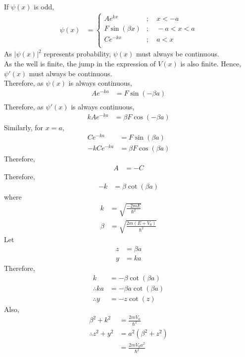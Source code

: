 \documentclass[titlepage, fleqn, a4paper, 12pt, twoside]{article}
\theoremstyle{definition}
\theoremstyle{theorem}
\begin{document}
If $\psi(x)$ is odd,
\begin{align*}
	\psi(x) &=
		\begin{cases}
			A e^{k x} &;\quad x < -a\\
			F \sin(\beta x) &;\quad -a < x < a\\
			C e^{-k x} &;\quad a < x\\
		\end{cases}
\end{align*}
As $\left| \psi(x) \right|^2$ represents probability, $\psi(x)$ must always be continuous.\\
As the well is finite, the jump in the expression of $V(x)$ is also finite.
Hence, $\psi'(x)$ must always be continuous.\\
Therefore, as $\psi(x)$ is always continuous,
\begin{align*}
	A e^{-k a} &= F \sin(-\beta a)\\
\end{align*}
Therefore, as $\psi'(x)$ is always continuous,
\begin{align*}
	k A e^{-k a} &= \beta F \cos(-\beta a)
\end{align*}
Similarly, for $x = a$,
\begin{align*}
	C e^{-k a} &= F \sin(\beta a)\\
	-k C e^{-k a} &= \beta F \cos(\beta a)
\end{align*}
Therefore,
\begin{align*}
	A &= -C
\end{align*}
Therefore,
\begin{align*}
	-k &= \beta \cot(\beta a)
\end{align*}
where
\begin{align*}
	k &= \sqrt{\frac{-2 m E}{\hbar^2}}\\
	\beta &= \sqrt{\frac{2 m (E + V_0)}{\hbar^2}}
\end{align*}
Let
\begin{align*}
	z &= \beta a\\
	y &= k a
\end{align*}
Therefore,
\begin{align*}
	k &= -\beta \cot(\beta a)\\
	\therefore k a &= -\beta a \cot(\beta a)\\
	\therefore y &= -z \cot(z)
\end{align*}
Also,
\begin{align*}
	\beta^2 + k^2 &= \frac{2 m V_0}{\hbar^2}\\
	\therefore z^2 + y^2 &= a^2 \left( \beta^2 + z^2 \right)\\
	&= \frac{2 m V_0 a^2}{\hbar^2}
\end{align*}
\end{document}
